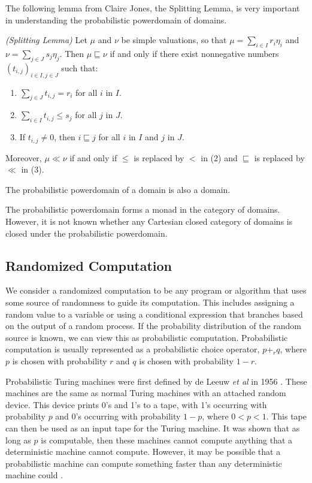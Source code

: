 The following lemma from Claire Jones, the Splitting Lemma, is very important in understanding the probabilistic powerdomain of domains.
\begin{lemma}
\emph{(Splitting Lemma)} Let $\mu$ and $\nu$ be simple valuations, so that $\mu = \sum_{i\in I} r_i\eta_i$ and $\nu = \sum_{j\in J} s_j\eta_j$.  Then $\mu \sqsubseteq \nu$ if and only if there exist nonnegative numbers $(t_{i,j})_{i\in I, j\in J}$ such that:
\begin{enumerate}
\item $\sum_{j\in J} t_{i,j} = r_i$ for all $i$ in $I$.
\item $\sum_{i\in I} t_{i,j} \leq s_j$ for all $j$ in $J$.
\item If $t_{i,j} \neq 0$, then $i\sqsubseteq j$ for all $i$ in $I$ and $j$ in $J$.
\end{enumerate}
Moreover, $\mu \ll \nu$ if and only if $\leq$ is replaced by $<$ in (2) and $\sqsubseteq$ is replaced by $\ll$ in (3).
\end{lemma}

\begin{theorem}
The probabilistic powerdomain of a domain is also a domain.
\end{theorem}

The probabilistic powerdomain forms a monad in the category of domains.  However, it is not known whether any Cartesian closed category of domains is closed under the probabilistic powerdomain.

\subsection{Randomized Computation}

We consider a randomized computation to be any program or algorithm that uses some source of randomness to guide its computation.  This includes assigning a random value to a variable or using a conditional expression that branches based on the output of a random process.  If the probability distribution of the random source is known, we can view this as probabilistic computation.  Probabilistic computation is usually represented as a probabilistic choice operator, $p +_r q$, where $p$ is chosen with probability $r$ and $q$ is chosen with probability $1-r$.

Probabilistic Turing machines were first defined by de Leeuw \emph{et al} in 1956 \cite{de1956computability}.  These machines are the same as normal Turing machines with an attached random device.  This device prints 0's and 1's to a tape, with 1's occurring with probability $p$ and 0's occurring with probability $1-p$, where $0 < p < 1$.  This tape can then be used as an input tape for the Turing machine.  It was shown that as long as $p$ is computable, then these machines cannot compute anything that a deterministic machine cannot compute.  However, it may be possible that a probabilistic machine can compute something faster than any deterministic machine could \cite{gill1977computational}.


